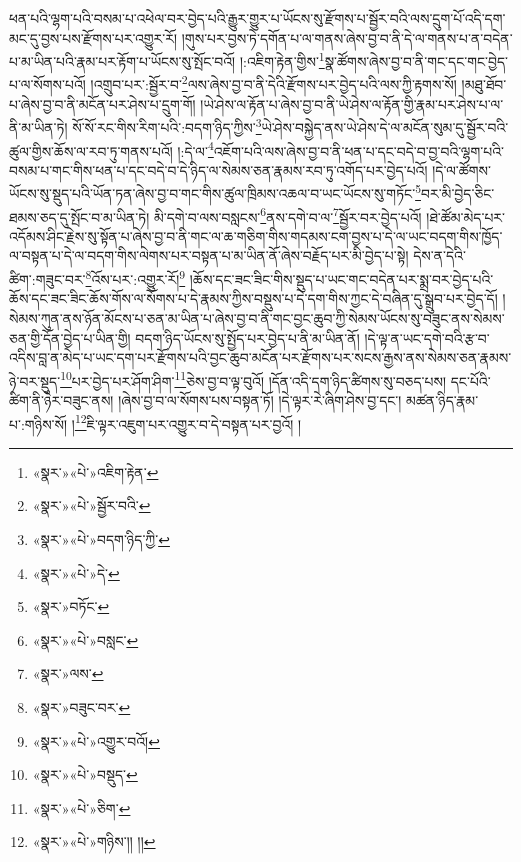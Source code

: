 ཕན་པའི་ལྷག་པའི་བསམ་པ་འཕེལ་བར་བྱེད་པའི་རྒྱུར་གྱུར་པ་ཡོངས་སུ་རྫོགས་པ་སྦྱོར་བའི་ལས་དྲུག་པོ་འདི་དག་མང་དུ་བྱས་པས་རྫོགས་པར་འགྱུར་རོ། །གུས་པར་བྱས་ཏེ་དགོན་པ་ལ་གནས་ཞེས་བྱ་བ་ནི་དེ་ལ་གནས་པ་ན་བདེན་པ་མ་ཡིན་པའི་རྣམ་པར་རྟོག་པ་ཡོངས་སུ་སྤོང་བའོ། །:འཇིག་རྟེན་གྱིས་\footnote{«སྣར་»«པེ་»འཇིག་རྟེན་}སྣ་ཚོགས་ཞེས་བྱ་བ་ནི་གང་དང་གང་བྱེད་པ་ལ་སོགས་པའོ། །འགྲུབ་པར་:སྦྱོར་བ་\footnote{«སྣར་»«པེ་»སྦྱོར་བའི་}ལས་ཞེས་བྱ་བ་ནི་དེའི་རྫོགས་པར་བྱེད་པའི་ལས་ཀྱི་རྟགས་སོ། །མཐུ་ཐོབ་པ་ཞེས་བྱ་བ་ནི་མངོན་པར་ཤེས་པ་དྲུག་གོ། །ཡེ་ཤེས་ལ་རྟོན་པ་ཞེས་བྱ་བ་ནི་ཡེ་ཤེས་ལ་རྟོན་གྱི་རྣམ་པར་ཤེས་པ་ལ་ནི་མ་ཡིན་ཏེ། སོ་སོ་རང་གིས་རིག་པའི་:བདག་ཉིད་ཀྱིས་\footnote{«སྣར་»«པེ་»བདག་ཉིད་ཀྱི་}ཡེ་ཤེས་བསྐྱེད་ནས་ཡེ་ཤེས་དེ་ལ་མངོན་སུམ་དུ་སྦྱོར་བའི་ཚུལ་གྱིས་ཆོས་ལ་རབ་ཏུ་གནས་པའོ། །:དེ་ལ་\footnote{«སྣར་»«པེ་»དེ་}འཇོག་པའི་ལས་ཞེས་བྱ་བ་ནི་ཕན་པ་དང་བདེ་བ་བྱ་བའི་ལྷག་པའི་བསམ་པ་གང་གིས་ཕན་པ་དང་བདེ་བ་དེ་ཉིད་ལ་སེམས་ཅན་རྣམས་རབ་ཏུ་འགོད་པར་བྱེད་པའོ། །དེ་ལ་ཚོགས་ཡོངས་སུ་སྡུད་པའི་ཡོན་ཏན་ཞེས་བྱ་བ་གང་གིས་ཚུལ་ཁྲིམས་འཆལ་བ་ཡང་ཡོངས་སུ་གཏོང་\footnote{«སྣར་»བཏོང་}བར་མི་བྱེད་ཅིང་ཐམས་ཅད་དུ་སྤོང་བ་མ་ཡིན་ཏེ། མི་དགེ་བ་ལས་བསླངས་\footnote{«སྣར་»«པེ་»བསླང་}ནས་དགེ་བ་ལ་\footnote{«སྣར་»ལས་}སྦྱོར་བར་བྱེད་པའོ། །ཐེ་ཚོམ་མེད་པར་འདོམས་ཤིང་རྗེས་སུ་སྟོན་པ་ཞེས་བྱ་བ་ནི་གང་ལ་ཆ་གཅིག་གིས་གདམས་ངག་བྱས་པ་དེ་ལ་ཡང་བདག་གིས་ཁྱོད་ལ་བསྟན་པ་དེ་ལ་བདག་གིས་ལེགས་པར་བསྟན་པ་མ་ཡིན་ནོ་ཞེས་བརྗོད་པར་མི་བྱེད་པ་སྟེ། དེས་ན་དེའི་ཚིག་:གཟུང་བར་\footnote{«སྣར་»བཟུང་བར་}འོས་པར་:འགྱུར་རོ།\footnote{«སྣར་»«པེ་»འགྱུར་བའོ།} །ཆོས་དང་ཟང་ཟིང་གིས་སྡུད་པ་ཡང་གང་བདེན་པར་སྨྲ་བར་བྱེད་པའི་ཆོས་དང་ཟང་ཟིང་ཆོས་གོས་ལ་སོགས་པ་དེ་རྣམས་ཀྱིས་བསྡུས་པ་དེ་དག་གིས་ཀྱང་དེ་བཞིན་དུ་སྒྲུབ་པར་བྱེད་དོ། །སེམས་ཀུན་ནས་ཉོན་མོངས་པ་ཅན་མ་ཡིན་པ་ཞེས་བྱ་བ་ནི་གང་བྱང་ཆུབ་ཀྱི་སེམས་ཡོངས་སུ་བཟུང་ནས་སེམས་ཅན་གྱི་དོན་བྱེད་པ་ཡིན་གྱི། བདག་ཉིད་ཡོངས་སུ་སྤྱོད་པར་བྱེད་པ་ནི་མ་ཡིན་ནོ། །དེ་ལྟ་ན་ཡང་དགེ་བའི་རྩ་བ་འདིས་བླ་ན་མེད་པ་ཡང་དག་པར་རྫོགས་པའི་བྱང་ཆུབ་མངོན་པར་རྫོགས་པར་སངས་རྒྱས་ནས་སེམས་ཅན་རྣམས་ཉེ་བར་སྡུད་\footnote{«སྣར་»«པེ་»བསྡུད་}པར་བྱེད་པར་ཤོག་ཤིག་\footnote{«སྣར་»«པེ་»ཅིག་}ཅེས་བྱ་བ་ལྟ་བུའོ། །དོན་འདི་དག་ཉིད་ཚིགས་སུ་བཅད་པས། དང་པོའི་ཚིག་ནི་ཉེར་བཟུང་ནས། །ཞེས་བྱ་བ་ལ་སོགས་པས་བསྟན་ཏོ། །དེ་ལྟར་རེ་ཞིག་ཤེས་བྱ་དང་། མཚན་ཉིད་རྣམ་པ་:གཉིས་སོ། །\footnote{«སྣར་»«པེ་»གཉིས་།། །།}ཇི་ལྟར་འཇུག་པར་འགྱུར་བ་དེ་བསྟན་པར་བྱའོ། །
